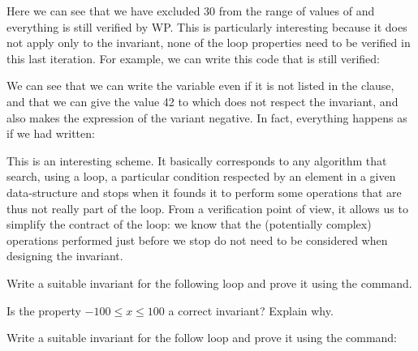 


Here we can see that we have excluded 30 from the range of values of
 and everything is still verified by WP. This is particularly
interesting because it does not apply only to the invariant, none of the loop
properties need to be verified in this last iteration. For example, we can
write this code that is still verified:






We can see that we can write the variable  even if it is not
listed in the  clause, and that we can give the
value 42 to  which does not respect the invariant, and also
makes the expression of the variant negative. In fact, everything happens
as if we had written:






This is an interesting scheme. It basically corresponds to any algorithm
that search, using a loop, a particular condition respected by an element
in a given data-structure and stops when it founds it to perform some
operations that are thus not really part of the loop. From a verification
point of view, it allows us to simplify the contract of the loop: we know
that the (potentially complex) operations performed just before we stop do
not need to be considered when designing the invariant.







Write a suitable invariant for the following loop and prove it using
the command.





Is the property $-100 \leq x $ a correct invariant? Explain why.





Write a suitable invariant for the follow loop and prove it using the
command:

